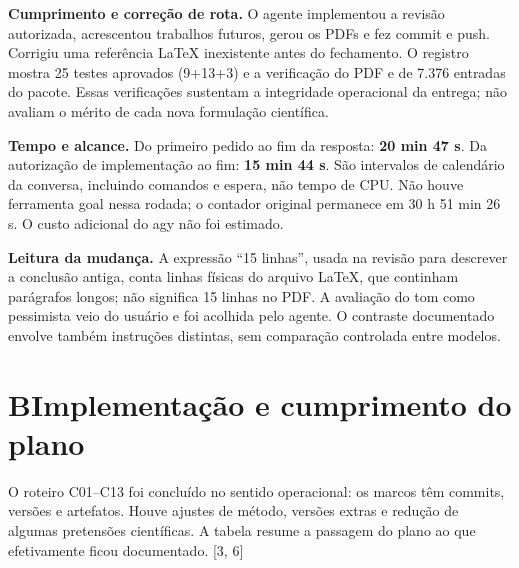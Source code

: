 \documentclass[11pt,a4paper]{article}
\newcommand{\fonte}[1]{{\small\color{navy}[#1]}}
\newcommand{\titulo}[2]{\section*{\color{navy}#1\quad #2}}
\begin{document}
\textbf{Cumprimento e correção de rota.} O agente implementou a revisão autorizada, acrescentou trabalhos futuros, gerou os PDFs e fez commit e push. Corrigiu uma referência LaTeX inexistente antes do fechamento. O registro mostra 25 testes aprovados (9+13+3) e a verificação do PDF e de 7.376 entradas do pacote. Essas verificações sustentam a integridade operacional da entrega; não avaliam o mérito de cada nova formulação científica.

\begin{destaque}
\textbf{Tempo e alcance.} Do primeiro pedido ao fim da resposta: \textbf{20 min 47 s}. Da autorização de implementação ao fim: \textbf{15 min 44 s}. São intervalos de calendário da conversa, incluindo comandos e espera, não tempo de CPU. Não houve ferramenta goal nessa rodada; o contador original permanece em 30 h 51 min 26 s. O custo adicional do agy não foi estimado.
\end{destaque}

\textbf{Leitura da mudança.} A expressão ``15 linhas'', usada na revisão para descrever a conclusão antiga, conta linhas físicas do arquivo LaTeX, que continham parágrafos longos; não significa 15 linhas no PDF. A avaliação do tom como pessimista veio do usuário e foi acolhida pelo agente. O contraste documentado envolve também instruções distintas, sem comparação controlada entre modelos.
\newpage

\titulo{B}{Implementação e cumprimento do plano}
O roteiro C01--C13 foi concluído no sentido operacional: os marcos têm commits, versões e artefatos. Houve ajustes de método, versões extras e redução de algumas pretensões científicas. A tabela resume a passagem do plano ao que efetivamente ficou documentado. \fonte{3, 6}
\end{document}

